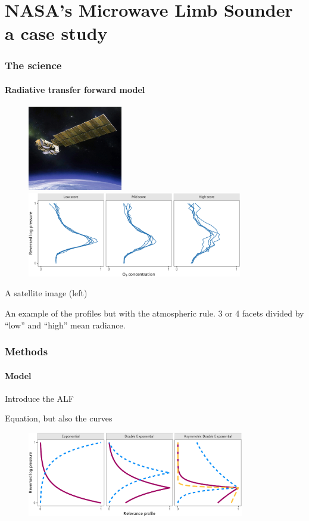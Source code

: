 \documentclass{snedecorbeamer}
\begin{document}
\section{NASA's Microwave Limb Sounder \\ {\small a case study}}

\begin{frame}
  \frametitle{The science}
  \framesubtitle{Radiative transfer forward model }

  \begin{figure}
    \centering
    \includegraphics[height=10em]{inc/mls_aura}
    \includegraphics[height=10em]{inc/mls_input_profiles}
  \end{figure}

  A satellite image (left)

  An example of the profiles but with the atmospheric rule. 3 or 4 facets
  divided by ``low'' and ``high'' mean radiance.
\end{frame}

\begin{frame}
  \frametitle{Methods}
  \framesubtitle{Model}

  Introduce the ALF

  Equation, but also the curves

  \begin{figure}
    \centering
    \includegraphics[height=10em]{inc/mls_weight_profiles}
  \end{figure}
\end{frame}
\end{document}
